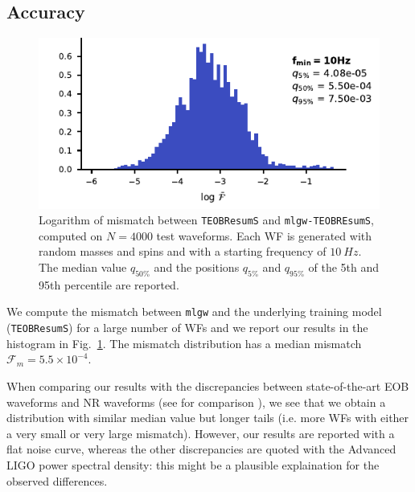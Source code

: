 \documentclass[twocolumn,showpacs,preprintnumbers,nofootinbib,prd,
superscriptaddress,10pt]{revtex4-1}
\begin{document}
\subsection{Accuracy}
\begin{figure}
	\centering
    \includegraphics[width=\linewidth]{img/F_hist.pdf}
	\caption{Logarithm of mismatch between \texttt{TEOBResumS} and \texttt{mlgw-TEOBREsumS}, computed on $N=4000$ test waveforms. 
	Each WF is generated with random masses and spins and with a starting frequency of $\SI{10}{Hz}$.
	The median value $q_{50\%}$ and the positions $q_{5\%}$ and $q_{95\%}$ of the 5th and 95th percentile are reported.
}
	\label{fig:F_hist}
\end{figure}
We compute the mismatch between \texttt{mlgw} and the underlying training model (\texttt{TEOBResumS}) for a large number of WFs
and we report our results in the histogram in Fig.~\ref{fig:F_hist}. The mismatch distribution has 
a median mismatch ${\mathcal{F}_m = 5.5 \times {10^{-4}}}$.

When comparing our results with the discrepancies between state-of-the-art EOB waveforms and NR waveforms (see for comparison \cite{Bohe:2016gbl, Nagar:2020pcj}), we see that we obtain a distribution with similar median value but longer tails (i.e. more WFs with either a very small or very large mismatch). However, our results are reported with a flat noise curve, whereas the other discrepancies are quoted with the Advanced LIGO power spectral density: this might be a plausible explaination for the observed differences.
\end{document}
